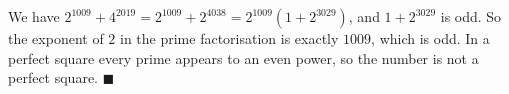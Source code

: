 We have $2^{1009}+4^{2019}=2^{1009}+2^{4038}=2^{1009}\left(1+2^{3029}\right)$, and $1+2^{3029}$ is odd. So the exponent of $2$ in the prime factorisation is exactly $1009$, which is odd. In a perfect square every prime appears to an even power, so the number is not a perfect square. $\blacksquare$
